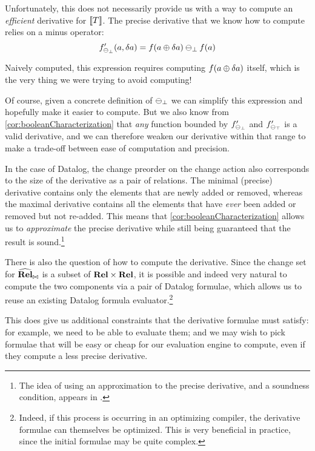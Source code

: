 Unfortunately, this does not necessarily provide us with a way to compute an \emph{efficient} 
derivative for $\llbracket T \rrbracket$. The precise derivative that we know how to compute relies on
a minus operator:
\begin{displaymath}
  f'_{\ominus_\bot}(a, \delta a) = f(a \oplus \delta a) \ominus_\bot f(a)
\end{displaymath}

Naively computed, this expression requires computing $f(a \oplus \delta a)$
itself, which is the very thing we were trying to avoid computing!

Of course, given a concrete definition of $\ominus_\bot$ we can simplify this
expression and hopefully make it easier to compute. But we also know from
\cref{cor:booleanCharacterization} that \emph{any} function bounded by
$f'_{\ominus_\bot}$ and $f'_{\ominus_\top}$ is a valid derivative,
and we can therefore weaken our derivative within that range to make a 
trade-off between ease of computation and precision.

In the case of Datalog, the change preorder on the change action also
corresponds to the size of the derivative as a pair of relations. The minimal (precise)
derivative contains only the elements that are newly added or removed,
whereas the maximal derivative contains all the elements that have \emph{ever}
been added or removed but not re-added. This means that \cref{cor:booleanCharacterization} allows
us to \emph{approximate} the precise derivative while still being
guaranteed that the result is sound.\footnote{The idea of using an approximation
to the precise derivative, and a soundness condition, appears in \textcite{bancilhon1986amateur}.}

There is also the question of how to compute the derivative. Since the change
set for $\widehat{\mathbf{Rel}}_{\bowtie}$ is a subset of $\mathbf{Rel} \times \mathbf{Rel}$, it
is possible and indeed very natural to compute the two components via a pair of
Datalog formulae, which allows us to reuse an existing Datalog formula
evaluator.\footnote{
  Indeed, if this process is occurring in an optimizing compiler,
  the derivative formulae can themselves be optimized. This is very 
  beneficial in practice, since the initial formulae may be quite complex.}

This does give us additional constraints that the derivative formulae must satisfy:
for example, we need to be able to evaluate them; and we may wish to pick formulae that will be easy or cheap
for our evaluation engine to compute, even if they compute a less precise derivative.

